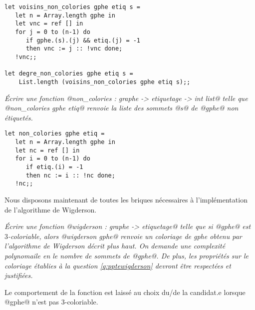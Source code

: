 \begin{Answer}
\begin{lstlisting}
let voisins_non_colories gphe etiq s =
   let n = Array.length gphe in
   let vnc = ref [] in
   for j = 0 to (n-1) do
      if gphe.(s).(j) && etiq.(j) = -1
      then vnc := j :: !vnc done;
   !vnc;;
  
let degre_non_colories gphe etiq s =
    List.length (voisins_non_colories gphe etiq s);;
\end{lstlisting}
\newpage
\end{Answer}
\begin{Exercise}\it Écrire une fonction @non_colories : graphe -> etiquetage -> int list@ telle que @non_colories gphe etiq@ renvoie la liste des sommets @s@ de @gphe@ non étiquetés.
\end{Exercise}  
\begin{Answer}
\begin{lstlisting}
let non_colories gphe etiq =
   let n = Array.length gphe in
   let nc = ref [] in
   for i = 0 to (n-1) do
      if etiq.(i) = -1
      then nc := i :: !nc done;
   !nc;;
\end{lstlisting}
\end{Answer}
Nous disposons maintenant de toutes les briques nécessaires à l'implémentation de l'algorithme de Wigderson. 
\begin{Exercise}\it Écrire une fonction @wigderson : graphe -> etiquetage@ telle que si @gphe@ est $3$-coloriable, alors @wigderson gphe@ renvoie un coloriage de gphe obtenu par l'algorithme de Wigderson décrit plus haut. On demande une complexité polynomaile en le nombre de sommets de @gphe@. De plus, les propriétés sur le coloriage établies à la question \ref{q:pptewigderson} devront être respectées et justifiées. 

Le comportement de la fonction est laissé au choix du/de la candidat.e lorsque @gphe@ n'est pas $3$-coloriable.
\end{Exercise}  
